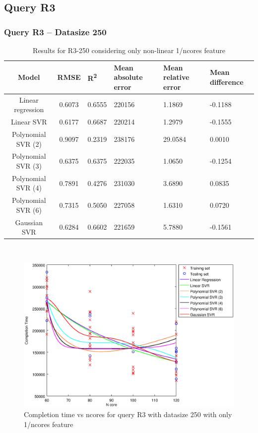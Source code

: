\documentclass[a4paper,11pt]{article}
\begin{document}
\newpage
\subsection{Query R3}
\subsubsection{Query R3 -- Datasize 250}
\begin{table}[H]
	\centering
	\begin{adjustbox}{center}
		\begin{tabular}{c | c M{1.2cm} M{2.5cm} M{2.5cm} M{1.8cm}}
			Model & RMSE & R\textsuperscript{2} & Mean absolute error & Mean relative error & Mean difference \tabularnewline
			\hline
			Linear regression & 0.6073 & 0.6555 & 220156 & 1.1869 & -0.1188 \\
			Linear SVR & 0.6177 & 0.6687 & 220214 & 1.2979 & -0.1555 \\
			Polynomial SVR (2) & 0.9097 & 0.2319 & 238176 & 29.0584 & 0.0010 \\
			Polynomial SVR (3) & 0.6375 & 0.6375 & 222035 & 1.0650 & -0.1254 \\
			Polynomial SVR (4) & 0.7891 & 0.4276 & 231030 & 3.6890 & 0.0835 \\
			Polynomial SVR (6) & 0.7315 & 0.5050 & 227058 & 1.6310 & 0.0720 \\
			Gaussian SVR & 0.6284 & 0.6602 & 221659 & 5.7880 & -0.1561 \\
		\end{tabular}
	\end{adjustbox}
	\\
	\caption{Results for R3-250 considering only non-linear 1/ncores feature}
	\label{table_R3_prediction_all}
\end{table}

\begin {figure}[hbtp]
\centering
\includegraphics[width=\textwidth]{output/R3_250_ONLY_1_OVER_NCORES/plot_R3_250.eps}
\caption {Completion time vs ncores for query R3 with datasize 250 with only 1/ncores feature}
\end {figure}
\end{document}
